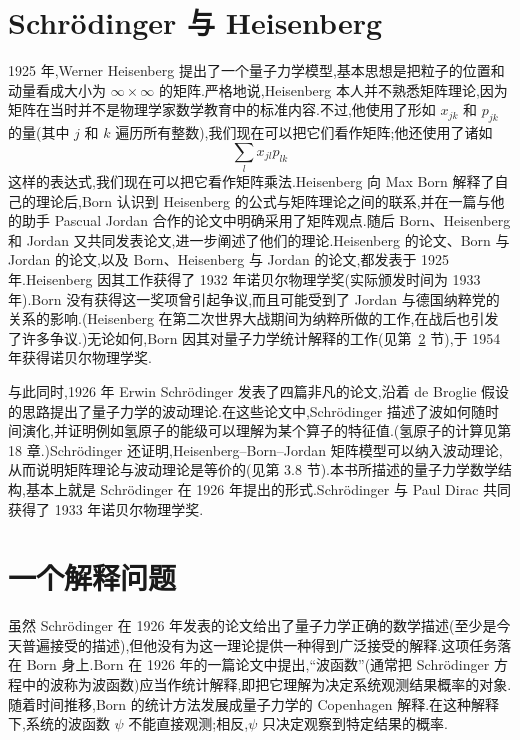 \section{Schrödinger 与 Heisenberg}\label{sec:schrodinger-heisenberg}

1925 年,Werner Heisenberg 提出了一个量子力学模型,基本思想是把粒子的位置和动量看成大小为 $\infty\times\infty$ 的矩阵.严格地说,Heisenberg 本人并不熟悉矩阵理论,因为矩阵在当时并不是物理学家数学教育中的标准内容.不过,他使用了形如 $x_{jk}$ 和 $p_{jk}$ 的量(其中 $j$ 和 $k$ 遍历所有整数),我们现在可以把它们看作矩阵;他还使用了诸如
\[
  \sum_l x_{jl}p_{lk}
\]
这样的表达式,我们现在可以把它看作矩阵乘法.Heisenberg 向 Max Born 解释了自己的理论后,Born 认识到 Heisenberg 的公式与矩阵理论之间的联系,并在一篇与他的助手 Pascual Jordan 合作的论文中明确采用了矩阵观点.随后 Born、Heisenberg 和 Jordan 又共同发表论文,进一步阐述了他们的理论.Heisenberg 的论文、Born 与 Jordan 的论文,以及 Born、Heisenberg 与 Jordan 的论文,都发表于 1925 年.Heisenberg 因其工作获得了 1932 年诺贝尔物理学奖(实际颁发时间为 1933 年).Born 没有获得这一奖项曾引起争议,而且可能受到了 Jordan 与德国纳粹党的关系的影响.(Heisenberg 在第二次世界大战期间为纳粹所做的工作,在战后也引发了许多争议.)无论如何,Born 因其对量子力学统计解释的工作(见第~\ref{sec:interpretation} 节),于 1954 年获得诺贝尔物理学奖.

与此同时,1926 年 Erwin Schrödinger 发表了四篇非凡的论文,沿着 de Broglie 假设的思路提出了量子力学的波动理论.在这些论文中,Schrödinger 描述了波如何随时间演化,并证明例如氢原子的能级可以理解为某个算子的特征值.(氢原子的计算见第 18 章.)Schrödinger 还证明,Heisenberg--Born--Jordan 矩阵模型可以纳入波动理论,从而说明矩阵理论与波动理论是等价的(见第 3.8 节).本书所描述的量子力学数学结构,基本上就是 Schrödinger 在 1926 年提出的形式.Schrödinger 与 Paul Dirac 共同获得了 1933 年诺贝尔物理学奖.

\section{一个解释问题}\label{sec:interpretation}

虽然 Schrödinger 在 1926 年发表的论文给出了量子力学正确的数学描述(至少是今天普遍接受的描述),但他没有为这一理论提供一种得到广泛接受的解释.这项任务落在 Born 身上.Born 在 1926 年的一篇论文中提出,“波函数”(通常把 Schrödinger 方程中的波称为波函数)应当作统计解释,即把它理解为决定系统观测结果概率的对象.随着时间推移,Born 的统计方法发展成量子力学的 Copenhagen 解释.在这种解释下,系统的波函数 $\psi$ 不能直接观测;相反,$\psi$ 只决定观察到特定结果的概率.

